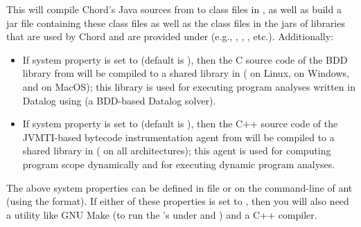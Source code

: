 This will compile Chord's Java sources from  to class files
in , as well as build a jar file  containing
these class files as well as the class files in the jars of libraries that are used by Chord
and are provided under  (e.g., , ,
, etc.).
Additionally:
\begin{itemize}
\item
If system property  is set to  (default is ),
then the C source code of the  BDD library
from  will be compiled to a shared library in 
( on Linux,  on Windows, and
 on MacOS); this library is used for executing
program analyses written in Datalog
using  (a BDD-based Datalog solver).
\item
If system property  is set to  (default is ),
then the C++ source code of the JVMTI-based bytecode instrumentation agent from
 will be compiled to a shared library in 
( on all architectures); this agent is
used for computing program scope dynamically and for executing
dynamic program analyses.
\end{itemize}
The above system properties can be defined in file 
or on the command-line of ant (using the  format).  If either of these
properties is set to , then you will also need a utility like GNU Make (to run the
's under  and ) and a C++ compiler.

